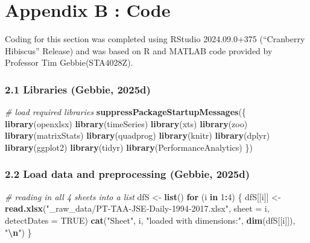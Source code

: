 \documentclass[
  12pt,
]{article}
\author{}
\date{\vspace{-2.5em}}
\newenvironment{Shaded}{\begin{snugshade}}{\end{snugshade}}
\newcommand{\AttributeTok}[1]{\textcolor[rgb]{0.13,0.29,0.53}{#1}}
\newcommand{\CommentTok}[1]{\textcolor[rgb]{0.56,0.35,0.01}{\textit{#1}}}
\newcommand{\ConstantTok}[1]{\textcolor[rgb]{0.56,0.35,0.01}{#1}}
\newcommand{\ControlFlowTok}[1]{\textcolor[rgb]{0.13,0.29,0.53}{\textbf{#1}}}
\newcommand{\DecValTok}[1]{\textcolor[rgb]{0.00,0.00,0.81}{#1}}
\newcommand{\FunctionTok}[1]{\textcolor[rgb]{0.13,0.29,0.53}{\textbf{#1}}}
\newcommand{\NormalTok}[1]{#1}
\newcommand{\OtherTok}[1]{\textcolor[rgb]{0.56,0.35,0.01}{#1}}
\newcommand{\SpecialCharTok}[1]{\textcolor[rgb]{0.81,0.36,0.00}{\textbf{#1}}}
\newcommand{\StringTok}[1]{\textcolor[rgb]{0.31,0.60,0.02}{#1}}
\begin{document}
\section{Appendix B : Code}\label{appendix-b-code}

Coding for this section was completed using RStudio 2024.09.0+375
(``Cranberry Hibiscus'' Release) and was based on R and MATLAB code
provided by Professor Tim Gebbie(STA4028Z).

\subsubsection{2.1 Libraries (Gebbie, 2025d)}\label{libraries-tim_prep}

\begin{Shaded}
\begin{Highlighting}[]
\CommentTok{\# load required libraries}
\FunctionTok{suppressPackageStartupMessages}\NormalTok{(\{}
\FunctionTok{library}\NormalTok{(openxlsx)     }
\FunctionTok{library}\NormalTok{(timeSeries)   }
\FunctionTok{library}\NormalTok{(xts)          }
\FunctionTok{library}\NormalTok{(zoo)          }
\FunctionTok{library}\NormalTok{(matrixStats) }
\FunctionTok{library}\NormalTok{(quadprog)     }
\FunctionTok{library}\NormalTok{(knitr)        }
\FunctionTok{library}\NormalTok{(dplyr)        }
\FunctionTok{library}\NormalTok{(ggplot2)      }
\FunctionTok{library}\NormalTok{(tidyr)  }
\FunctionTok{library}\NormalTok{(PerformanceAnalytics)}
\NormalTok{\})}
\end{Highlighting}
\end{Shaded}

\subsubsection{2.2 Load data and preprocessing (Gebbie,
2025d)}\label{load-data-and-preprocessing-tim_prep}

\begin{Shaded}
\begin{Highlighting}[]
\CommentTok{\# reading in all 4 sheets into a list}
\NormalTok{dfS }\OtherTok{\textless{}{-}} \FunctionTok{list}\NormalTok{()}
\ControlFlowTok{for}\NormalTok{ (i }\ControlFlowTok{in} \DecValTok{1}\SpecialCharTok{:}\DecValTok{4}\NormalTok{) \{}
\NormalTok{  dfS[[i]] }\OtherTok{\textless{}{-}} \FunctionTok{read.xlsx}\NormalTok{(}\StringTok{"\_raw\_data/PT{-}TAA{-}JSE{-}Daily{-}1994{-}2017.xlsx"}\NormalTok{, }\AttributeTok{sheet =}\NormalTok{ i, }\AttributeTok{detectDates =} \ConstantTok{TRUE}\NormalTok{)}
  \FunctionTok{cat}\NormalTok{(}\StringTok{"Sheet"}\NormalTok{, i, }\StringTok{"loaded with dimensions:"}\NormalTok{, }\FunctionTok{dim}\NormalTok{(dfS[[i]]), }\StringTok{"}\SpecialCharTok{\textbackslash{}n}\StringTok{"}\NormalTok{)}
\NormalTok{\}}
\end{Highlighting}
\end{Shaded}
\end{document}

